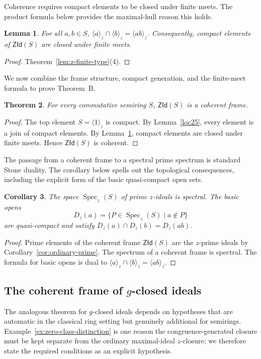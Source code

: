 \documentclass[11pt,leqno]{amsart}
\theoremstyle{plain}
\newtheorem{theorem}{Theorem}[section]
\newtheorem{lemma}[theorem]{Lemma}
\newtheorem{corollary}[theorem]{Corollary}
\theoremstyle{definition}
\theoremstyle{remark}
\numberwithin{equation}{section}
\DeclareMathOperator{\Spec}{Spec}
\newcommand{\ZId}{\mathsf{ZId}}
\newcommand{\ideal}[1]{\langle #1\rangle}
\begin{document}
Coherence requires compact elements to be closed under finite meets.
The product formula below provides the maximal-hull reason this holds.

\begin{lemma}\label{loc23}
For all $a,b\in S$, $\ideal{a}_z\cap\ideal{b}_z=\ideal{ab}_z$.
Consequently, compact elements of $\ZId(S)$ are closed under finite
meets.
\end{lemma}
\begin{proof}
Theorem~\ref{lem:z-finite-type}(4).
\end{proof}

We now combine the frame structure, compact generation,
and the finite-meet formula to prove Theorem~B.

\begin{theorem}\label{ZId(S)-is-coherent}
For every commutative semiring $S$, $\ZId(S)$ is a coherent frame.
\end{theorem}
\begin{proof}
The top element $S=\ideal{1}_z$ is compact.
By Lemma~\ref{loc25}, every element is a join of compact elements.
By Lemma~\ref{loc23}, compact elements are closed under finite meets.
Hence $\ZId(S)$ is coherent.
\end{proof}

The passage from a coherent frame to a spectral prime spectrum is
standard Stone duality.
The corollary below spells out the topological consequences,
including the explicit form of the basic quasi-compact open sets.

\begin{corollary}\label{cor:zspec-spectral}
The space $\Spec_z(S)$ of prime $z$-ideals is spectral.
The basic opens
\[
D_z(a)=\{P\in\Spec_z(S)\mid a\notin P\}
\]
are quasi-compact and satisfy $D_z(a)\cap D_z(b)=D_z(ab)$.
\end{corollary}
\begin{proof}
Prime elements of the coherent frame $\ZId(S)$ are the $z$-prime
ideals by Corollary~\ref{cor:ordinary-prime}.
The spectrum of a coherent frame is spectral.
The formula for basic opens is dual to $\ideal{a}_z\cap\ideal{b}_z
=\ideal{ab}_z$.
\end{proof}

\subsection{The coherent frame of \texorpdfstring{$g$}{g}-closed
ideals}

The analogous theorem for $g$-closed ideals depends on hypotheses
that are automatic in the classical ring setting but genuinely
additional for semirings.
Example~\ref{ex:zero-class-distinction} is one reason the
congruence-generated closure must be kept separate from the ordinary
maximal-ideal $z$-closure;
we therefore state the required conditions as an explicit hypothesis.
\end{document}
